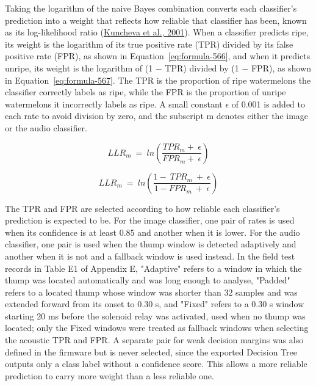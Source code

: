 \begin{thesisprose}
Taking the logarithm of the naive Bayes combination converts each classifier’s prediction into a weight that reflects how reliable that classifier has been, known as its log-likelihood ratio (\hyperlink{cite.kuncheva2001}{Kuncheva et al., 2001}). When a classifier predicts ripe, its weight is the logarithm of its true positive rate (TPR) divided by its false positive rate (FPR), as shown in Equation~\eqref{eq:formula-566}, and when it predicts unripe, its weight is the logarithm of (1 \ensuremath{-} TPR) divided by (1 \ensuremath{-} FPR), as shown in Equation~\eqref{eq:formula-567}. The TPR is the proportion of ripe watermelons the classifier correctly labels as ripe, while the FPR is the proportion of unripe watermelons it incorrectly labels as ripe. A small constant \ensuremath{\epsilon} of 0.001 is added to each rate to avoid division by zero, and the subscript m denotes either the image or the audio classifier.

\begin{equation}
  LLR_{m}\  = \ ln(\frac{TPR_{m} + \ \epsilon}{FPR_{m} + \ \epsilon})
  \label{eq:formula-566}
\end{equation}

\begin{equation}
  LLR_{m}\  = \ ln(\frac{1 - \ TPR_{m}\  + \ \epsilon}{1 - FPR_{m}\  + \ \epsilon})
  \label{eq:formula-567}
\end{equation}

The TPR and FPR are selected according to how reliable each classifier’s prediction is expected to be. For the image classifier, one pair of rates is used when its confidence is at least 0.85 and another when it is lower. For the audio classifier, one pair is used when the thump window is detected adaptively and another when it is not and a fallback window is used instead. In the field test records in Table E1 of Appendix E, "Adaptive" refers to a window in which the thump was located automatically and was long enough to analyse, "Padded" refers to a located thump whose window was shorter than 32 samples and was extended forward from its onset to 0.30 s, and "Fixed" refers to a 0.30 s window starting 20 ms before the solenoid relay was activated, used when no thump was located; only the Fixed windows were treated as fallback windows when selecting the acoustic TPR and FPR. A separate pair for weak decision margins was also defined in the firmware but is never selected, since the exported Decision Tree outputs only a class label without a confidence score. This allows a more reliable prediction to carry more weight than a less reliable one.


\end{thesisprose}
